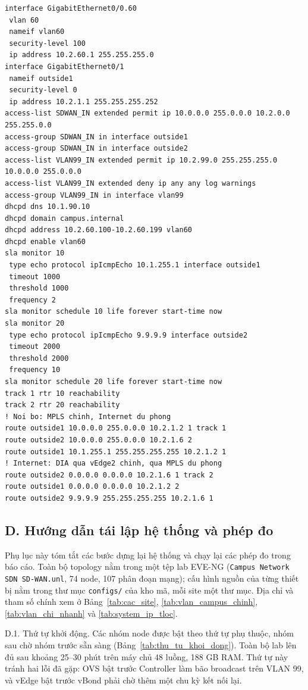\begin{lstlisting}[style=customcode, caption={Giao diện, ACL, DHCP, IP SLA và tuyến trên Brand-FW Site 200 (rút gọn)}]
interface GigabitEthernet0/0.60
 vlan 60
 nameif vlan60
 security-level 100
 ip address 10.2.60.1 255.255.255.0
interface GigabitEthernet0/1
 nameif outside1
 security-level 0
 ip address 10.2.1.1 255.255.255.252
access-list SDWAN_IN extended permit ip 10.0.0.0 255.0.0.0 10.2.0.0 255.255.0.0
access-group SDWAN_IN in interface outside1
access-group SDWAN_IN in interface outside2
access-list VLAN99_IN extended permit ip 10.2.99.0 255.255.255.0 10.0.0.0 255.0.0.0
access-list VLAN99_IN extended deny ip any any log warnings
access-group VLAN99_IN in interface vlan99
dhcpd dns 10.1.90.10
dhcpd domain campus.internal
dhcpd address 10.2.60.100-10.2.60.199 vlan60
dhcpd enable vlan60
sla monitor 10
 type echo protocol ipIcmpEcho 10.1.255.1 interface outside1
 timeout 1000
 threshold 1000
 frequency 2
sla monitor schedule 10 life forever start-time now
sla monitor 20
 type echo protocol ipIcmpEcho 9.9.9.9 interface outside2
 timeout 2000
 threshold 2000
 frequency 10
sla monitor schedule 20 life forever start-time now
track 1 rtr 10 reachability
track 2 rtr 20 reachability
! Noi bo: MPLS chinh, Internet du phong
route outside1 10.0.0.0 255.0.0.0 10.2.1.2 1 track 1
route outside2 10.0.0.0 255.0.0.0 10.2.1.6 2
route outside1 10.1.255.1 255.255.255.255 10.2.1.2 1
! Internet: DIA qua vEdge2 chinh, qua MPLS du phong
route outside2 0.0.0.0 0.0.0.0 10.2.1.6 1 track 2
route outside1 0.0.0.0 0.0.0.0 10.2.1.2 2
route outside2 9.9.9.9 255.255.255.255 10.2.1.6 1
\end{lstlisting}

\subsection*{D. Hướng dẫn tái lập hệ thống và phép đo}
\setcounter{table}{0}

Phụ lục này tóm tắt các bước dựng lại hệ thống và chạy lại các phép đo trong báo cáo. Toàn bộ topology nằm trong một tệp lab EVE-NG (\texttt{Campus Network SDN SD-WAN.unl}, 74 node, 107 phân đoạn mạng); cấu hình nguồn của từng thiết bị nằm trong thư mục \texttt{configs/} của kho mã, mỗi site một thư mục. Địa chỉ và tham số chính xem ở Bảng~\ref{tab:cac_site}, \ref{tab:vlan_campus_chinh}, \ref{tab:vlan_chi_nhanh} và \ref{tab:system_ip_tloc}.

D.1. Thứ tự khởi động. Các nhóm node được bật theo thứ tự phụ thuộc, nhóm sau chờ nhóm trước sẵn sàng (Bảng~\ref{tab:thu_tu_khoi_dong}). Toàn bộ lab lên đủ sau khoảng 25--30 phút trên máy chủ 48 luồng, 188 GB RAM. Thứ tự này tránh hai lỗi đã gặp: OVS bật trước Controller làm bão broadcast trên VLAN 99, và vEdge bật trước vBond phải chờ thêm một chu kỳ kết nối lại.

